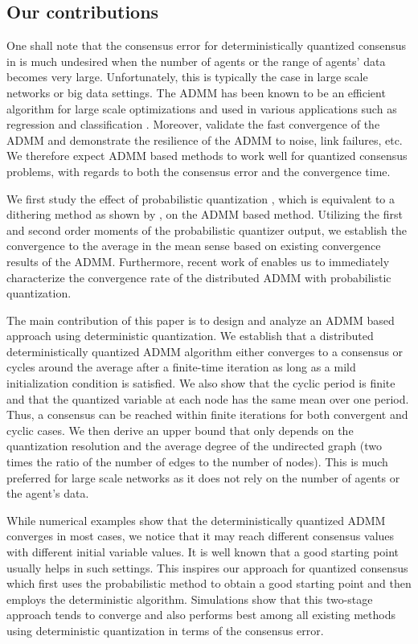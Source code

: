 \documentclass[journal]{IEEEtran}
\begin{document}
\subsection{Our contributions}
One shall note that the consensus error for deterministically quantized consensus in \cite{Nedic2009,Carli2010} is much undesired when the number of agents or the range of agents' data becomes very large. Unfortunately, this is typically the case in large scale networks or big data settings. The ADMM has been known to be an efficient algorithm for large scale optimizations and used in various applications such as regression and classification \cite{BoydADMM}. Moreover, \cite{He2012, Hong2012, Deng2016} validate the fast convergence of the ADMM and \cite{Zhu2009, Erseghe2011} demonstrate the resilience of the ADMM to noise, link failures, etc. We therefore expect ADMM based methods to work well for quantized consensus problems, with regards to both the consensus error and the convergence time.

We first study the effect of probabilistic quantization \cite{Xiao2005a}, which is equivalent to a dithering method as shown by \cite[Lemma 2]{Aysal2008}, on the ADMM based method. Utilizing the first and second order moments of the probabilistic quantizer output, we establish the convergence to the average in the mean sense based on existing convergence results of the ADMM. Furthermore, recent work of \cite{Shi2014} enables us to immediately characterize the convergence rate of the distributed ADMM with probabilistic quantization.

The main contribution of this paper is to design and analyze an ADMM based approach using deterministic quantization. We establish that a distributed deterministically quantized ADMM algorithm either converges to a consensus or cycles around the average after a finite-time iteration as long as a mild initialization condition is satisfied. We also show that the cyclic period is finite and that the quantized variable at each node has the same mean over one period. Thus, a consensus can be reached within finite iterations for both convergent and cyclic cases. We then derive an upper bound that only depends on the quantization resolution and the average degree of the undirected graph (two times the ratio of the number of edges to the number of nodes). This is much preferred for large scale networks as it does not rely on the number of agents or the agent's data.

While numerical examples show that the deterministically quantized ADMM converges in most cases, we notice that it may reach different consensus values with different initial variable values. It is well known that a good starting point usually helps in such settings. This inspires our approach for quantized consensus which first uses the probabilistic method to obtain a good starting point and then employs the deterministic algorithm. Simulations show that this two-stage approach tends to converge and also performs best among all existing methods using deterministic quantization in terms of the consensus error. 
\end{document}
